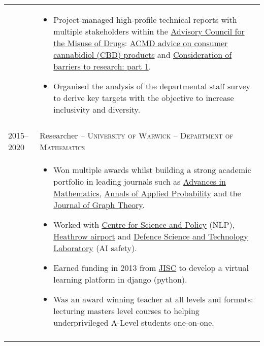 \documentclass[a4paper,10pt]{article}
\begin{document}
\begin{tabular}{p{2.25cm}|p{15cm}}
 	 & \vspace{-0.07 in}\begin{itemize}
 	 	\item Project-managed high-profile technical reports with multiple stakeholders within the \href{https://www.gov.uk/government/organisations/advisory-council-on-the-misuse-of-drugs}{Advisory Council for the Misuse of Drugs}: \href{https://www.gov.uk/government/publications/acmd-advice-on-consumer-cannabidiol-cbd-products}{ACMD advice on consumer cannabidiol (CBD) products} and \href{https://www.gov.uk/government/publications/consideration-of-barriers-to-research-part-1}{Consideration of barriers to research: part 1}.
 	 	\item Organised the analysis of the departmental staff survey to derive key targets with the objective to increase inclusivity and diversity.
	\end{itemize}\vspace{-0.15 in}\\
\multicolumn{2}{c}{} \\
%
%
	\textsc{2015--2020} & \large{Researcher -- \textsc{University of Warwick} -- \textsc{Department of Mathematics}}\\
	 & \vspace{-0.07 in}\begin{itemize}
	\item Won multiple awards whilst building a strong academic portfolio in leading journals such as \href{https://www.sciencedirect.com/science/article/pii/S0001870818303347}{Advances in Mathematics}, \href{https://projecteuclid.org/journals/annals-of-applied-probability/volume-32/issue-1/From-the-Bernoulli-factory-to-a-dice-enterprise-via-perfect/10.1214/21-AAP1679.short}{Annals of Applied Probability} and the \href{http://onlinelibrary.wiley.com/doi/10.1002/jgt.22002/abstract}{Journal of Graph Theory}.
	\item Worked with \href{https://www.csap.cam.ac.uk/}{Centre for Science and Policy} (NLP), \href{https://www.heathrow.com/}{Heathrow airport} and \href{https://www.gov.uk/government/organisations/defence-science-and-technology-laboratory}{Defence Science and Technology Laboratory} (AI safety).
	\item Earned funding in 2013 from \href{https://www.jisc.ac.uk/}{JISC} to develop a virtual learning platform in django (python).
	\item Was an award winning teacher at all levels and formats: lecturing masters level courses to helping underprivileged A-Level students one-on-one.
\end{itemize}\vspace{-0.15 in}\\
\multicolumn{2}{c}{} \\
\end{tabular}
\vspace{-0.5cm}
\end{document}
